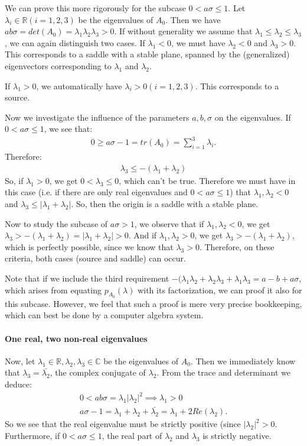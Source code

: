 We can prove this more rigorously for the subcase $0 < a\sigma \leq
1$. Let $\lambda_i \in \mathbb{R} (i=1,2,3)$ be the eigenvalues of
$A_0$.  Then we have $ab\sigma = det(A_0) =
\lambda_1\lambda_2\lambda_3 > 0$.  If without generality we assume
that $\lambda_1 \leq \lambda_2 \leq \lambda_3$, we can again
distinguish two cases.  If $\lambda_1 < 0$, we must have $\lambda_2 <
0$ and $\lambda_3 > 0$.  This corresponds to a saddle with a stable
plane, spanned by the (generalized) eigenvectors corresponding to
$\lambda_1$ and $\lambda_2$.

If $\lambda_1 > 0$, we automatically have $\lambda_i > 0 (i=1,2,3)$.
This corresponds to a source.

Now we investigate the influence of the parameters $a,b,\sigma$ on the
eigenvalues.  If $0 < a\sigma \leq 1$, we see that:
\begin{gather*}
  0 \geq a\sigma - 1 = tr(A_0) = \sum_{i=1}^3 \lambda_i.
\end{gather*}
Therefore:
\begin{gather*}
  \lambda_3 \leq -(\lambda_1 + \lambda_2)
\end{gather*}
So, if $\lambda_1 > 0$, we get $0 < \lambda_3 \leq 0$, which can't be
true.  Therefore we must have in this case (i.e. if there are only
real eigenvalues and $0 < a\sigma \leq 1$) that $\lambda_1,\lambda_2 <
0$ and $\lambda_3 \leq |\lambda_1 + \lambda_2|$.  So, then the origin
is a saddle with a stable plane.

Now to study the subcase of $a\sigma > 1$, we observe that if
$\lambda_1,\lambda_2 < 0$, we get $\lambda_3 > - (\lambda_1 +
\lambda_2) = |\lambda_1 + \lambda_2| > 0$.  And if
$\lambda_1,\lambda_2>0$, we get $\lambda_3 > -(\lambda_1 +
\lambda_2)$, which is perfectly possible, since we know that
$\lambda_3 > 0$.  Therefore, on these criteria, both cases (source and
saddle) can occur.

Note that if we include the third requirement $-(\lambda_1\lambda_2 +
\lambda_2 \lambda_3 + \lambda_1\lambda_3 = a-b+a\sigma$, which arises
from equating $p_{A_0}(\lambda)$ with its factorization, we can proof
it also for this subcase.  However, we feel that such a proof is mere
very precise bookkeeping, which can best be done by a computer algebra
system.

\paragraph{One real, two non-real eigenvalues}
Now, let $\lambda_1\in\mathbb{R}, \lambda_2,\lambda_3\in\mathbb{C}$
be the eigenvalues of $A_0$.  Then we immediately know that $\lambda_3
= \bar{\lambda_2}$, the complex conjugate of $\lambda_2$.  From the
trace and determinant we deduce:
\begin{gather*}
  0 < ab\sigma = \lambda_1 |\lambda_2|^2 \implies \lambda_1 > 0\\
  a\sigma - 1 = \lambda_1 + \lambda_2 + \bar{\lambda_2} 
  = \lambda_1 + 2 Re(\lambda_2).
\end{gather*}
So we see that the real eigenvalue must be strictly positive (since
$|\lambda_2|^2 > 0$. Furthermore, if $0< a\sigma \leq 1$, the real part
of $\lambda_2$ and $\lambda_3$ is strictly negative.

